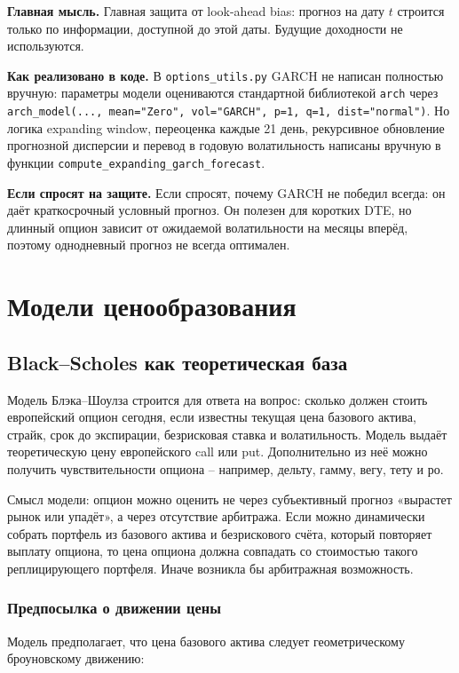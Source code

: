 \documentclass[11pt,a4paper]{article}
\newcommand{\key}[1]{%
  \vspace{0.15em}
  \noindent\colorbox{softblue}{%
    \parbox{\dimexpr\linewidth-2\fboxsep\relax}{\textbf{Главная мысль.} #1}%
  }\vspace{0.2em}
}
\newcommand{\answer}[1]{%
  \vspace{0.15em}
  \noindent\colorbox{softgreen}{%
    \parbox{\dimexpr\linewidth-2\fboxsep\relax}{\textbf{Если спросят на защите.} #1}%
  }\vspace{0.2em}
}
\newcommand{\impl}[1]{%
  \vspace{0.15em}
  \noindent\colorbox{softblue}{%
    \parbox{\dimexpr\linewidth-2\fboxsep\relax}{\textbf{Как реализовано в коде.} #1}%
  }\vspace{0.2em}
}
\begin{document}
\key{Главная защита от look-ahead bias: прогноз на дату $t$ строится только по информации, доступной до этой даты. Будущие доходности не используются.}

\impl{В \texttt{options\_utils.py} GARCH не написан полностью вручную: параметры модели оцениваются стандартной библиотекой \texttt{arch} через \texttt{arch\_model(..., mean="Zero", vol="GARCH", p=1, q=1, dist="normal")}. Но логика expanding window, переоценка каждые 21 день, рекурсивное обновление прогнозной дисперсии и перевод в годовую волатильность написаны вручную в функции \texttt{compute\_expanding\_garch\_forecast}.}

\answer{Если спросят, почему GARCH не победил всегда: он даёт краткосрочный условный прогноз. Он полезен для коротких DTE, но длинный опцион зависит от ожидаемой волатильности на месяцы вперёд, поэтому однодневный прогноз не всегда оптимален.}

\section{Модели ценообразования}

\subsection{Black--Scholes как теоретическая база}

Модель Блэка--Шоулза строится для ответа на вопрос: сколько должен стоить европейский опцион сегодня, если известны текущая цена базового актива, страйк, срок до экспирации, безрисковая ставка и волатильность. Модель выдаёт теоретическую цену европейского call или put. Дополнительно из неё можно получить чувствительности опциона -- например, дельту, гамму, вегу, тету и ро.

Смысл модели: опцион можно оценить не через субъективный прогноз «вырастет рынок или упадёт», а через отсутствие арбитража. Если можно динамически собрать портфель из базового актива и безрискового счёта, который повторяет выплату опциона, то цена опциона должна совпадать со стоимостью такого реплицирующего портфеля. Иначе возникла бы арбитражная возможность.

\subsubsection{Предпосылка о движении цены}

Модель предполагает, что цена базового актива следует геометрическому броуновскому движению:
\end{document}
